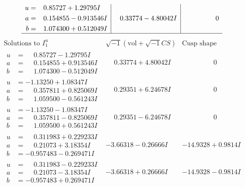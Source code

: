 \documentclass[1p]{elsarticle_modified}
\theoremstyle{definition}
\newcommand{\I}{\sqrt{-1}}
\begin{document}
$$\begin{array}{c|c|c}
\begin{aligned}
u &= \phantom{-}0.85727 + 1.29795 I \\
a &= \phantom{-}0.154855 - 0.913546 I \\
b &= \phantom{-}1.074300 + 0.512049 I\end{aligned}
 & \phantom{-}0.33774 - 4.80042 I & \phantom{-0.000000 } 0\\
 \hline 
 \end{array}$$\newpage$$\begin{array}{c|c|c}  
\text{Solutions to }I^u_{1}& \I (\text{vol} + \sqrt{-1}CS) & \text{Cusp shape}\\
 \hline 
\begin{aligned}
u &= \phantom{-}0.85727 - 1.29795 I \\
a &= \phantom{-}0.154855 + 0.913546 I \\
b &= \phantom{-}1.074300 - 0.512049 I\end{aligned}
 & \phantom{-}0.33774 + 4.80042 I & \phantom{-0.000000 } 0 \\ \hline\begin{aligned}
u &= -1.13250 + 1.08347 I \\
a &= \phantom{-}0.357811 + 0.825069 I \\
b &= \phantom{-}1.059500 - 0.561243 I\end{aligned}
 & \phantom{-}0.29351 + 6.24678 I & \phantom{-0.000000 } 0 \\ \hline\begin{aligned}
u &= -1.13250 - 1.08347 I \\
a &= \phantom{-}0.357811 - 0.825069 I \\
b &= \phantom{-}1.059500 + 0.561243 I\end{aligned}
 & \phantom{-}0.29351 - 6.24678 I & \phantom{-0.000000 } 0 \\ \hline\begin{aligned}
u &= \phantom{-}0.311983 + 0.229233 I \\
a &= \phantom{-}0.21073 + 3.18354 I \\
b &= -0.957483 - 0.269471 I\end{aligned}
 & -3.66318 - 0.26666 I & -14.9328 + 0.9814 I \\ \hline\begin{aligned}
u &= \phantom{-}0.311983 - 0.229233 I \\
a &= \phantom{-}0.21073 - 3.18354 I \\
b &= -0.957483 + 0.269471 I\end{aligned}
 & -3.66318 + 0.26666 I & -14.9328 - 0.9814 I \\ \hline\begin{aligned}

\end{aligned}
\end{array}$$
\end{document}
